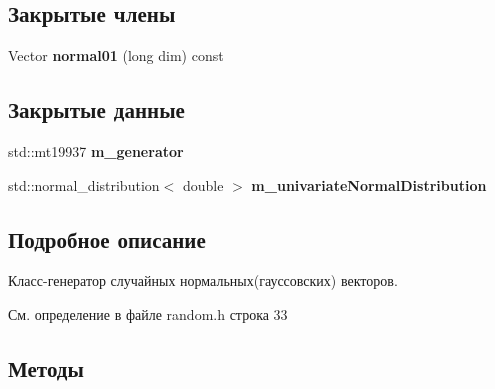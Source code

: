 \subsection*{Закрытые члены}
\begin{DoxyCompactItemize}
\item 
\hypertarget{class_math_1_1_multivariate_normal_distribution_ae333dd0cb7a26e159cc9b72ef3f6d6e4}{}\label{class_math_1_1_multivariate_normal_distribution_ae333dd0cb7a26e159cc9b72ef3f6d6e4} 
Vector {\bfseries normal01} (long dim) const
\end{DoxyCompactItemize}
\subsection*{Закрытые данные}
\begin{DoxyCompactItemize}
\item 
\hypertarget{class_math_1_1_multivariate_normal_distribution_a10b916638bf187caeee4e06ada03a563}{}\label{class_math_1_1_multivariate_normal_distribution_a10b916638bf187caeee4e06ada03a563} 
std\+::mt19937 {\bfseries m\+\_\+generator}
\item 
\hypertarget{class_math_1_1_multivariate_normal_distribution_a1936e5faaa85d78874ff143c44ee34f5}{}\label{class_math_1_1_multivariate_normal_distribution_a1936e5faaa85d78874ff143c44ee34f5} 
std\+::normal\+\_\+distribution$<$ double $>$ {\bfseries m\+\_\+univariate\+Normal\+Distribution}
\end{DoxyCompactItemize}


\subsection{Подробное описание}
Класс-\/генератор случайных нормальных(гауссовских) векторов. 

См. определение в файле random.\+h строка 33



\subsection{Методы}
\hypertarget{class_math_1_1_multivariate_normal_distribution_aeedc94bd79f9798ffedf86851b76de47}{}\label{class_math_1_1_multivariate_normal_distribution_aeedc94bd79f9798ffedf86851b76de47} 
